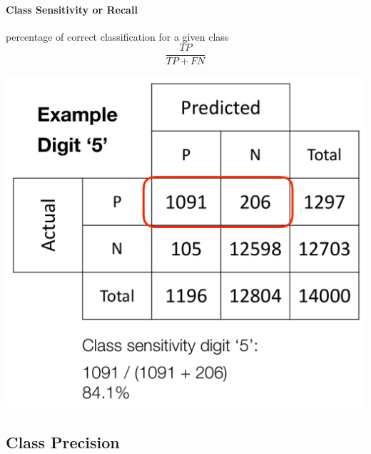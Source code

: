 \documentclass[11pt]{article}
\begin{document}
\begin{minipage}{0.5\textwidth}
	\paragraph{Class Sensitivity or Recall} percentage of correct classification for a given class
	\begin{equation*}
	\frac{TP}{TP+FN}
	\end{equation*}
\end{minipage}
\begin{minipage}{0.5\textwidth}
	\centering
	\includegraphics[width=0.8\linewidth,keepaspectratio]{class_recall}
\end{minipage}

\subsection{Class Precision}
\end{document}
